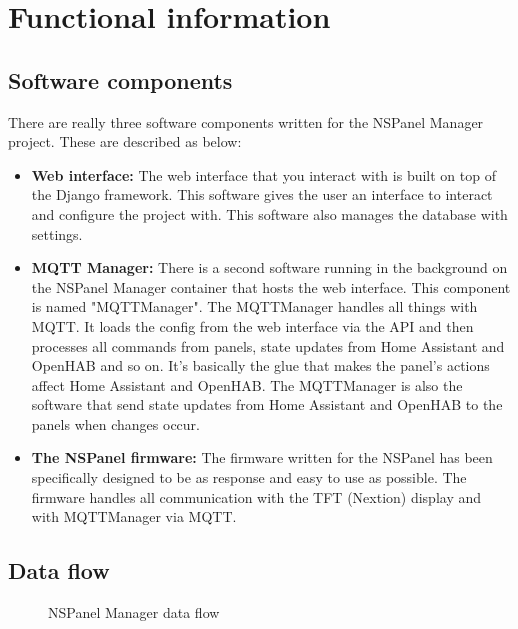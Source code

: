 \documentclass[10pt]{article}
\begin{document}
    \clearpage
    \section{Functional information}
    \subsection{Software components}
    There are really three software components written for the NSPanel Manager project. These are described as below:
    \begin{itemize}
      \item \textbf{Web interface:} The web interface that you interact with is built on top of the Django framework. This software gives the user an interface to interact and configure the project with. This software also manages the database with settings.
      \item \textbf{MQTT Manager:} There is a second software running in the background on the NSPanel Manager container that hosts the web interface. This component is named "MQTTManager". The MQTTManager handles all things with MQTT. It loads the config from the web interface via the API and then processes all commands from panels, state updates from Home Assistant and OpenHAB and so on. It's basically the glue that makes the panel's actions affect Home Assistant and OpenHAB. The MQTTManager is also the software that send state updates from Home Assistant and OpenHAB to the panels when changes occur.
      \item \textbf{The NSPanel firmware:} The firmware written for the NSPanel has been specifically designed to be as response and easy to use as possible. The firmware handles all communication with the TFT (Nextion) display and with MQTTManager via MQTT.
    \end{itemize}

    \subsection{Data flow}

    \begin{figure}[H]
    \centering
    \caption{NSPanel Manager data flow}%
    \end{figure}
\end{document}
